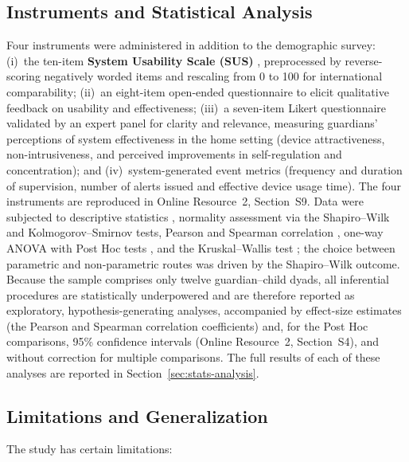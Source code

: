 \subsection{Instruments and Statistical Analysis}
Four instruments were administered in addition to the demographic survey: (i)~the ten-item \textbf{System Usability Scale (SUS)} \citep{Brown1989}, preprocessed by reverse-scoring negatively worded items and rescaling from 0 to 100 for international comparability; (ii)~an eight-item open-ended questionnaire to elicit qualitative feedback on usability and effectiveness; (iii)~a seven-item Likert questionnaire validated by an expert panel for clarity and relevance, measuring guardians' perceptions of system effectiveness in the home setting (device attractiveness, non-intrusiveness, and perceived improvements in self-regulation and concentration); and (iv)~system-generated event metrics (frequency and duration of supervision, number of alerts issued and effective device usage time). The four instruments are reproduced in Online Resource~2, Section~S9. Data were subjected to descriptive statistics \citep{Yaska2024Assessment}, normality assessment via the Shapiro--Wilk \citep{Souza2023Sample} and Kolmogorov--Smirnov \citep{Lilliefors1969Kolmogorov} tests, Pearson \citep{Yu2024Inferential} and Spearman \citep{Yu2024Robust} correlation \citep{Jebb2021Review}, one-way ANOVA \citep{Dubey2025Two,Rojas2025Validating} with Post Hoc tests \citep{Ogrodniczek2025Comparative}, and the Kruskal--Wallis test \citep{Jamil2024Influence,Smeeton2025Applied}; the choice between parametric and non-parametric routes was driven by the Shapiro--Wilk outcome. Because the sample comprises only twelve guardian--child dyads, all inferential procedures are statistically underpowered and are therefore reported as exploratory, hypothesis-generating analyses, accompanied by effect-size estimates (the Pearson and Spearman correlation coefficients) and, for the Post Hoc comparisons, 95\% confidence intervals (Online Resource~2, Section~S4), and without correction for multiple comparisons. The full results of each of these analyses are reported in Section~\ref{sec:stats-analysis}.

\subsection{Limitations and Generalization}
The study has certain limitations:

